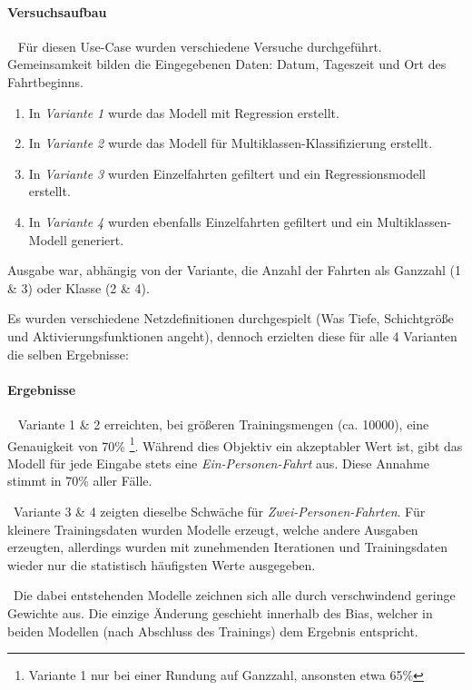\paragraph{Versuchsaufbau} ~\newline
Für diesen Use-Case wurden verschiedene Versuche durchgeführt. Gemeinsamkeit bilden die Eingegebenen Daten: Datum, Tageszeit und Ort des Fahrtbeginns. 
\begin{enumerate}
	\item In \textit{Variante 1} wurde das Modell mit Regression erstellt. 
	\item In \textit{Variante 2} wurde das Modell für Multiklassen-Klassifizierung erstellt.
	\item In \textit{Variante 3} wurden Einzelfahrten gefiltert und ein Regressionsmodell erstellt. 
	\item In \textit{Variante 4} wurden ebenfalls Einzelfahrten gefiltert und ein Multiklassen-Modell generiert. 
\end{enumerate}
Ausgabe war, abhängig von der Variante, die Anzahl der Fahrten als Ganzzahl (1 \& 3) oder Klasse (2 \& 4). 

Es wurden verschiedene Netzdefinitionen durchgespielt (Was Tiefe, Schichtgröße und Aktivierungsfunktionen angeht), dennoch erzielten diese für alle 4 Varianten die selben Ergebnisse:
\paragraph{Ergebnisse} ~\newline
Variante 1 \& 2 erreichten, bei größeren Trainingsmengen (ca. 10000), eine Genauigkeit von 70\% \footnote{Variante 1 nur bei einer Rundung auf Ganzzahl, ansonsten etwa 65\%}. Während dies Objektiv ein akzeptabler Wert ist, gibt das Modell für jede Eingabe stets eine \textit{Ein-Personen-Fahrt} aus. Diese Annahme stimmt in 70\% aller Fälle. 

~\newline Variante 3 \& 4 zeigten dieselbe Schwäche für \textit{Zwei-Personen-Fahrten}. Für kleinere Trainingsdaten wurden Modelle erzeugt, welche andere Ausgaben erzeugten, allerdings wurden mit zunehmenden Iterationen und Trainingsdaten wieder nur die statistisch häufigsten Werte ausgegeben. 

~\newline Die dabei entstehenden Modelle zeichnen sich alle durch verschwindend geringe Gewichte aus. Die einzige Änderung geschieht innerhalb des Bias, welcher in beiden Modellen (nach Abschluss des Trainings) dem Ergebnis entspricht.

